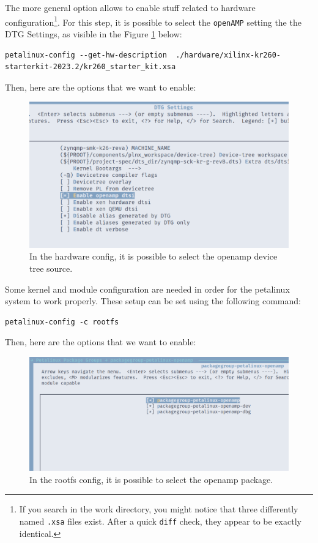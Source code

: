 \documentclass[10pt]{article}
\begin{document}
The more general option allows to enable stuff related to hardware
configuration\footnote{If you search in the work directory, you might notice that three
differently named \texttt{.xsa} files exist. After a quick \texttt{diff} check, they appear to be
exactly identical.}. For this step, it is possible to select the \texttt{openAMP}
setting the the DTG Settings, as visible in the Figure \ref{fig:orgc0c79e7} below:
\begin{verbatim}
petalinux-config --get-hw-description  ./hardware/xilinx-kr260-starterkit-2023.2/kr260_starter_kit.xsa
\end{verbatim}

Then, here are the options that we want to enable:
\begin{figure}[htbp]
\centering
\includegraphics[width=.6\textwidth]{./img/yocto_openamp_dtg.png}
\caption{\label{fig:orgc0c79e7}In the hardware config, it is possible to select the openamp device tree source.}
\end{figure}

Some kernel and module configuration are needed in order for the petalinux system to work properly.
These setup can be set using the following command:
\begin{verbatim}
petalinux-config -c rootfs
\end{verbatim}

Then, here are the options that we want to enable:
\begin{figure}[htbp]
\centering
\includegraphics[width=.6\textwidth]{./img/yocto_openamp.png}
\caption{\label{fig:orgdcb9562}In the rootfs config, it is possible to select the openamp package.}
\end{figure}
\end{document}
